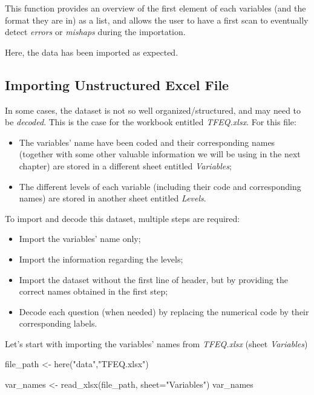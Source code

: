 \documentclass[
]{book}
\newenvironment{Shaded}{\begin{snugshade}}{\end{snugshade}}
\newcommand{\AttributeTok}[1]{\textcolor[rgb]{0.77,0.63,0.00}{#1}}
\newcommand{\FunctionTok}[1]{\textcolor[rgb]{0.00,0.00,0.00}{#1}}
\newcommand{\NormalTok}[1]{#1}
\newcommand{\OtherTok}[1]{\textcolor[rgb]{0.56,0.35,0.01}{#1}}
\newcommand{\StringTok}[1]{\textcolor[rgb]{0.31,0.60,0.02}{#1}}
\providecommand{\tightlist}{%
  \setlength{\itemsep}{0pt}\setlength{\parskip}{0pt}}
\begin{document}
This function provides an overview of the first element of each variables (and the format they are in) as a list, and allows the user to have a first scan to eventually detect \emph{errors} or \emph{mishaps} during the importation.

Here, the data has been imported as expected.

\hypertarget{importing-unstructured-excel-file}{%
\subsection{Importing Unstructured Excel File}\label{importing-unstructured-excel-file}}

In some cases, the dataset is not so well organized/structured, and may need to be \emph{decoded}. This is the case for the workbook entitled \emph{TFEQ.xlsx}. For this file:

\begin{itemize}
\tightlist
\item
  The variables' name have been coded and their corresponding names (together with some other valuable information we will be using in the next chapter) are stored in a different sheet entitled \emph{Variables};
\item
  The different levels of each variable (including their code and corresponding names) are stored in another sheet entitled \emph{Levels}.
\end{itemize}

To import and decode this dataset, multiple steps are required:

\begin{itemize}
\tightlist
\item
  Import the variables' name only;
\item
  Import the information regarding the levels;
\item
  Import the dataset without the first line of header, but by providing the correct names obtained in the first step;
\item
  Decode each question (when needed) by replacing the numerical code by their corresponding labels.
\end{itemize}

Let's start with importing the variables' names from \emph{TFEQ.xlsx} (sheet \emph{Variables})

\begin{Shaded}
\begin{Highlighting}[]
\NormalTok{file\_path }\OtherTok{\textless{}{-}} \FunctionTok{here}\NormalTok{(}\StringTok{"data"}\NormalTok{,}\StringTok{"TFEQ.xlsx"}\NormalTok{) }

\NormalTok{var\_names }\OtherTok{\textless{}{-}} \FunctionTok{read\_xlsx}\NormalTok{(file\_path, }\AttributeTok{sheet=}\StringTok{"Variables"}\NormalTok{)}
\NormalTok{var\_names}
\end{Highlighting}
\end{Shaded}
\end{document}
